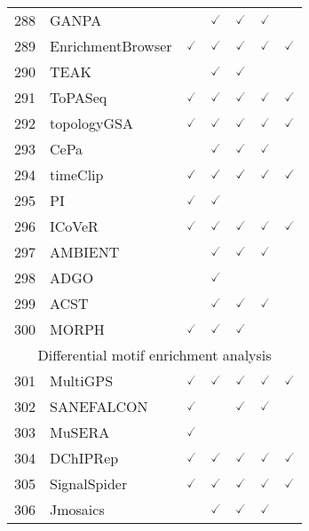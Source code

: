 \documentclass[10pt,letterpaper]{article}
\begin{document}
\begin{table}[!ht]
\begin{adjustwidth}{-2.25in}{0in}
\begin{tabular}{|c|l|c|c|c|c|c|}
288 & GANPA\cite{fang2012network} & & $\checked$ & $\checked$ & $\checked$ & \\ 
289 & EnrichmentBrowser\cite{geistlinger2016bioconductor} & $\checked$ & $\checked$ & $\checked$ & $\checked$ & $\checked$  \\
290 & TEAK\cite{judeh2012teak} & & $\checked$ & $\checked$ & & \\
291 & ToPASeq\cite{ihnatova2015topaseq} & $\checked$ & $\checked$ & $\checked$ & $\checked$ & $\checked$  \\ 
292 & topologyGSA\cite{massa2016package} & $\checked$ & $\checked$ & $\checked$ & $\checked$ & $\checked$  \\ 
293 & CePa\cite{gu2013cepa} & & $\checked$ & $\checked$ & $\checked$ & \\
294 & timeClip\cite{martini2014timeclip} & $\checked$ & $\checked$ & $\checked$ & $\checked$ & $\checked$  \\ 
295 & PI\cite{bianco2016pathway} & $\checked$ & $\checked$ & & & \\
296 & ICoVeR\cite{broeksema2017icover} & $\checked$ & $\checked$ & $\checked$ & $\checked$ & $\checked$  \\ 
297 & AMBIENT\cite{bryant2013ambient} & & $\checked$ & $\checked$ & $\checked$ & \\
298 & ADGO\cite{nam2006adgo} & & $\checked$ & & & \\
299 & ACST\cite{mieczkowski2012identification} & & $\checked$ & $\checked$ & $\checked$ & \\
300 & MORPH\cite{amar2015morph} & $\checked$ & $\checked$ & $\checked$ & & \\ \hline
\hline
\multicolumn{7}{|c|}{Differential motif enrichment analysis} \\ \hline
\hline
301 & MultiGPS\cite{mahony2014integrated} & $\checked$ & $\checked$ & $\checked$ & $\checked$ & $\checked$  \\ 
302 & SANEFALCON\cite{straver2016calculating} & $\checked$ & & $\checked$ & $\checked$ & \\
303 & MuSERA\cite{lam2016histones} & $\checked$ & & & & \\
304 & DChIPRep\cite{chabbert2016dchiprep} & $\checked$ & $\checked$ & $\checked$ & $\checked$ & $\checked$  \\ 
305 & SignalSpider\cite{wong2014signalspider} & $\checked$ & $\checked$ & $\checked$ & $\checked$ & $\checked$  \\ 
306 & Jmosaics\cite{zeng2013jmosaics} & & $\checked$ & $\checked$ & $\checked$ &  \\ 

\end{tabular}
\end{adjustwidth}
\end{table}
\end{document}
